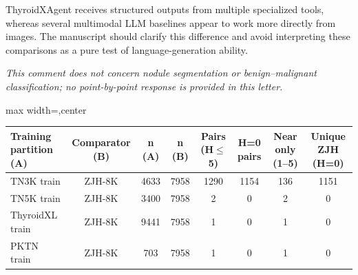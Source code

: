 \begin{reviewercomment}
ThyroidXAgent receives structured outputs from multiple specialized tools, whereas several multimodal LLM baselines appear to work more directly from images. The manuscript should clarify this difference and avoid interpreting these comparisons as a pure test of language-generation ability.
\end{reviewercomment}
\begin{authorresponse}
\noindent\textit{This comment does not concern nodule segmentation or benign--malignant classification; no point-by-point response is provided in this letter.}
\end{authorresponse}
\responseappendix
\begin{responsetable}
\caption{}
\begin{adjustbox}{max width=\textwidth,center}
\begin{tabular}{lccccccc}
\toprule
Training partition (A) & Comparator (B) & n (A) & n (B) & Pairs (H$\leq$5) & H=0 pairs & Near only (1--5) & Unique ZJH (H=0) \\
\midrule
TN3K train & ZJH-8K & 4633 & 7958 & 1290 & 1154 & 136 & 1151 \\
TN5K train & ZJH-8K & 3400 & 7958 & 2 & 0 & 2 & 0 \\
ThyroidXL train & ZJH-8K & 9441 & 7958 & 1 & 0 & 1 & 0 \\
PKTN train & ZJH-8K & 703 & 7958 & 1 & 0 & 1 & 0 \\
\bottomrule
\end{tabular}
\end{adjustbox}
\end{responsetable}

